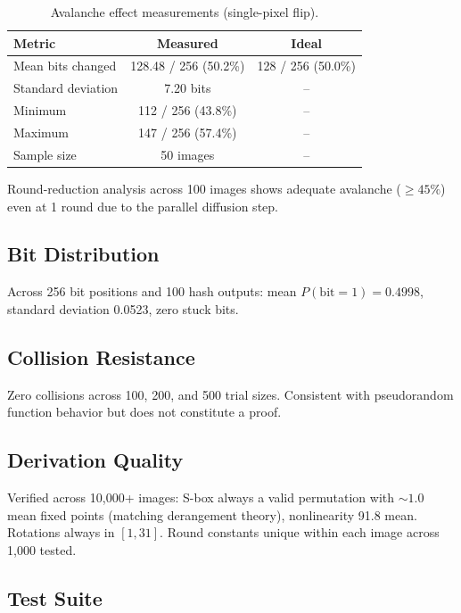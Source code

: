 \documentclass[preprint]{iacrtrans}
\begin{document}
\begin{table}[h]
\centering
\begin{tabular}{@{}lcc@{}}
\toprule
\textbf{Metric} & \textbf{Measured} & \textbf{Ideal} \\
\midrule
Mean bits changed & 128.48 / 256 (50.2\%) & 128 / 256 (50.0\%) \\
Standard deviation & 7.20 bits & -- \\
Minimum & 112 / 256 (43.8\%) & -- \\
Maximum & 147 / 256 (57.4\%) & -- \\
Sample size & 50 images & -- \\
\bottomrule
\end{tabular}
\caption{Avalanche effect measurements (single-pixel flip).}
\end{table}

Round-reduction analysis across 100 images shows adequate avalanche ($\geq 45\%$) even at 1 round due to the parallel diffusion step.

\subsection{Bit Distribution}

Across 256 bit positions and 100 hash outputs: mean $P(\text{bit} = 1) = 0.4998$, standard deviation 0.0523, zero stuck bits.

\subsection{Collision Resistance}

Zero collisions across 100, 200, and 500 trial sizes. Consistent with pseudorandom function behavior but does not constitute a proof.

\subsection{Derivation Quality}

Verified across 10{,}000+ images: S-box always a valid permutation with ${\sim}1.0$ mean fixed points (matching derangement theory), nonlinearity 91.8 mean. Rotations always in $[1, 31]$. Round constants unique within each image across 1{,}000 tested.

\subsection{Test Suite}
\end{document}
